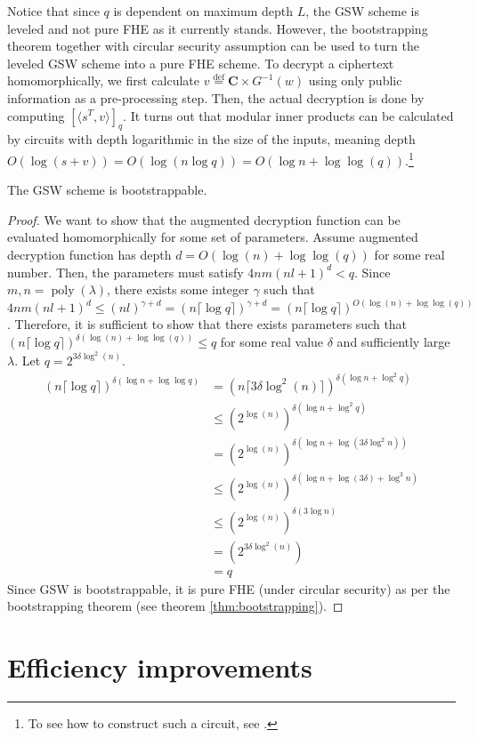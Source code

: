 Notice that since $q$ is dependent on maximum depth $L$, the GSW scheme is leveled and not pure FHE as it currently stands. However, the bootstrapping theorem together with circular security assumption can be used to turn the leveled GSW scheme into a pure FHE scheme. To decrypt a ciphertext homomorphically, we first calculate $v \stackrel{\mathrm{def}}{=} \textbf{C} \times G^{-1}(w)$ using only public information as a pre-processing step. Then, the actual decryption is done by computing $[\langle s^T, v \rangle]_q$. It turns out that modular inner products can be calculated by circuits with depth logarithmic in the size of the inputs, meaning depth $O(\log(s + v)) = O(\log(n \log q))= O(\log n + \log\log(q))$.\footnote{To see how to construct such a circuit, see \cite{Hal18}.}
\begin{theorem}
    The GSW scheme is bootstrappable.
\end{theorem}
\begin{proof}
We want to show that the augmented decryption function can be evaluated homomorphically for some set of parameters. Assume augmented decryption function has depth $d = O(\log(n) + \log\log(q))$ for some real number. Then, the parameters must satisfy $4nm(nl+1)^d < q$. Since $m,n = \operatorname{poly}(\lambda)$, there exists some integer $\gamma$ such that $4nm(nl+1)^{d} \leq (nl)^{\gamma + d} = (n\lceil\log q \rceil)^{\gamma + d} = (n \lceil\log q \rceil ) ^{O(\log(n) + \log\log(q))}$. Therefore, it is sufficient to show that there exists parameters such that $(n \lceil\log q \rceil ) ^{\delta (\log(n) + \log\log(q))} \leq q$ for some real value $\delta$ and sufficiently large $\lambda$. Let $q = 2^{3\delta\log^2(n)}$.
\begin{equation*}
    \begin{aligned}
        (n \lceil \log q \rceil )^{\delta (\log n + \log \log q)} &= (n \lceil 3\delta \log^2(n) \rceil)^{\delta (\log n + \log^2 q)}\\
        & \leq (2^{\log(n)})^{\delta (\log n + \log^2 q)}\\
        & = (2^{\log(n)})^{\delta (\log n + \log (3\delta \log^2n))} \\
        & \leq (2^{\log(n)})^{\delta (\log n + \log (3\delta) + \log^3n)} \\
        & \leq (2^{\log(n)})^{\delta (3\log n)} \\
        & = (2^{3\delta\log^2(n)})\\
        & = q
    \end{aligned} 
\end{equation*}
Since GSW is bootstrappable, it is pure FHE (under circular security) as per the bootstrapping theorem (see theorem \ref{thm:bootstrapping}).
\end{proof}

\section{Efficiency improvements}